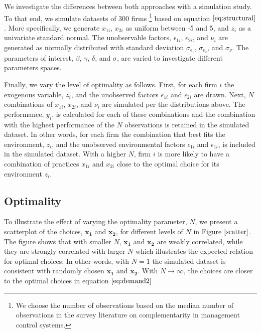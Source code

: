 \documentclass[12pt]{article}
\begin{document}
We investigate the differences between both approaches with a simulation
study. To that end, we simulate datasets of 300 firms \footnote{We
  choose the number of observations based on the median number of
  observations in the survey literature on complementarity in management
  control systems.} based on equation \(\eqref{eq:structural}\). More
specifically, we generate \(x_{1i}\), \(x_{2i}\) as uniform between -5
and 5, and \(z_i\) as a univariate standard normal. The unobservable
factors, \(\epsilon_{1i}\), \(\epsilon_{2i}\), and \(\nu_i\) are
generated as normally distributed with standard deviation
\(\sigma_{\epsilon_1}\), \(\sigma_{\epsilon_2}\), and \(\sigma_{\nu}\).
The parameters of interest, \(\beta\), \(\gamma\), \(\delta\), and
\(\sigma\), are varied to investigate different parameters spaces.

Finally, we vary the level of optimality as follows. First, for each
firm \(i\) the exogenous variable, \(z_i\), and the unobserved factors
\(\epsilon_{1i}\) and \(\epsilon_{2i}\) are drawn. Next, \(N\)
combinations of \(x_{1i}\), \(x_{2i}\), and \(\nu_i\) are simulated per
the distributions above. The performance, \(y_i\), is calculated for
each of these combinations and the combination with the highest
performance of the \(N\) observations is retained in the simulated
dataset. In other words, for each firm the combination that best fits
the environment, \(z_i\), and the unobserved environmental factors
\(\epsilon_{1i}\) and \(\epsilon_{1i}\), is included in the simulated
dataset. With a higher \(N\), firm \(i\) is more likely to have a
combination of practices \(x_{1i}\) and \(x_{2i}\) close to the optimal
choice for its environment \(z_i\).

\subsection{Optimality}\label{optimality}

To illustrate the effect of varying the optimality parameter, \(N\), we
present a scatterplot of the choices, \(\mathbf{x_1}\) and
\(\mathbf{x_2}\), for different levels of \(N\) in Figure
\(\ref{scatter}\). The figure shows that with smaller \(N\),
\(\mathbf{x_1}\) and \(\mathbf{x_2}\) are weakly correlated, while they
are strongly correlated with larger \(N\) which illustrates the expected
relation for optimal choices. In other words, with \(N=1\) the simulated
dataset is consistent with randomly chosen \(\mathbf{x_1}\) and
\(\mathbf{x_2}\). With \(N \to \infty\), the choices are closer to the
optimal choices in equation \(\eqref{eq:demand2}\)
\end{document}
